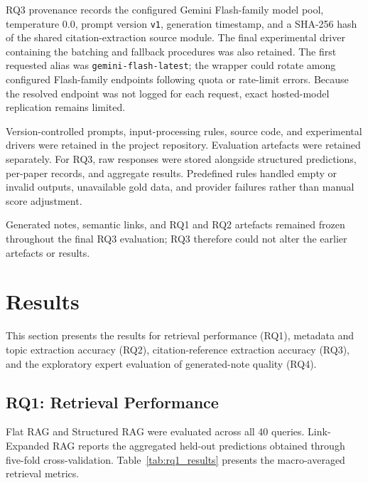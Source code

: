 \documentclass[runningheads]{llncs}
\begin{document}
RQ3 provenance records the configured Gemini Flash-family model pool,
temperature \(0.0\), prompt version \texttt{v1}, generation timestamp,
and a SHA-256 hash of the shared citation-extraction source module. The
final experimental driver containing the batching and fallback
procedures was also retained. The first requested alias was
\texttt{gemini-flash-latest}; the wrapper could rotate among configured
Flash-family endpoints following quota or rate-limit errors. Because the
resolved endpoint was not logged for each request, exact hosted-model
replication remains limited.

Version-controlled prompts, input-processing rules, source code, and
experimental drivers were retained in the project repository.
Evaluation artefacts were retained separately. For RQ3, raw responses
were stored alongside structured predictions, per-paper records, and
aggregate results. Predefined rules handled empty or invalid outputs,
unavailable gold data, and provider failures rather than manual score
adjustment.

Generated notes, semantic links, and RQ1 and RQ2 artefacts remained
frozen throughout the final RQ3 evaluation; RQ3 therefore could not
alter the earlier artefacts or results.

\FloatBarrier

\section{Results}
\label{sec:results}

This section presents the results for retrieval performance (RQ1),
metadata and topic extraction accuracy (RQ2), citation-reference
extraction accuracy (RQ3), and the exploratory expert evaluation of
generated-note quality (RQ4).

\subsection{RQ1: Retrieval Performance}
\label{sec:rq1_results}

Flat RAG and Structured RAG were evaluated across all 40 queries.
Link-Expanded RAG reports the aggregated held-out predictions obtained
through five-fold cross-validation. Table~\ref{tab:rq1_results}
presents the macro-averaged retrieval metrics.
\end{document}
